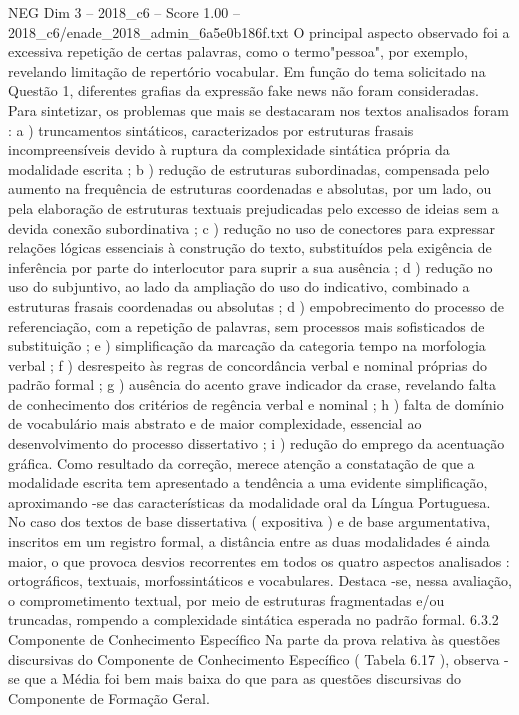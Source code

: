 \begin{textsample}{NEG Dim 3 – 2018\_c6 – Score 1.00 – 2018\_c6/enade\_2018\_admin\_6a5e0b186f.txt}
O principal aspecto observado foi a excessiva repetição de certas palavras, como o termo"pessoa", por exemplo, revelando limitação de repertório vocabular.
Em função do tema solicitado na Questão 1, diferentes grafias da expressão fake news não foram consideradas.
Para sintetizar, os problemas que mais se destacaram nos textos analisados foram : a ) truncamentos sintáticos, caracterizados por estruturas frasais incompreensíveis devido à ruptura da complexidade sintática própria da modalidade escrita ; b ) redução de estruturas subordinadas, compensada pelo aumento na frequência de estruturas coordenadas e absolutas, por um lado, ou pela elaboração de estruturas textuais prejudicadas pelo excesso de ideias sem a devida conexão subordinativa ; c ) redução no uso de conectores para expressar relações lógicas essenciais à construção do texto, substituídos pela exigência de inferência por parte do interlocutor para suprir a sua ausência ; d ) redução no uso do subjuntivo, ao lado da ampliação do uso do indicativo, combinado a estruturas frasais coordenadas ou absolutas ; d ) empobrecimento do processo de referenciação, com a repetição de palavras, sem processos mais sofisticados de substituição ; e ) simplificação da marcação da categoria tempo na morfologia verbal ; f ) desrespeito às regras de concordância verbal e nominal próprias do padrão formal ; g ) ausência do acento grave indicador da crase, revelando falta de conhecimento dos critérios de regência verbal e nominal ; h ) falta de domínio de vocabulário mais abstrato e de maior complexidade, essencial ao desenvolvimento do processo dissertativo ; i ) redução do emprego da acentuação gráfica.
Como resultado da correção, merece atenção a constatação de que a modalidade escrita tem apresentado a tendência a uma evidente simplificação, aproximando -se das características da modalidade oral da Língua Portuguesa.
No caso dos textos de base dissertativa ( expositiva ) e de base argumentativa, inscritos em um registro formal, a distância entre as duas modalidades é ainda maior, o que provoca desvios recorrentes em todos os quatro aspectos analisados : ortográficos, textuais, morfossintáticos e vocabulares.
Destaca -se, nessa avaliação, o comprometimento textual, por meio de estruturas fragmentadas e/ou truncadas, rompendo a complexidade sintática esperada no padrão formal. 6.3.2 Componente de Conhecimento Específico Na parte da prova relativa às questões discursivas do Componente de Conhecimento Específico ( Tabela 6.17 ), observa -se que a Média foi bem mais baixa do que para as questões discursivas do Componente de Formação Geral.

\end{textsample}

